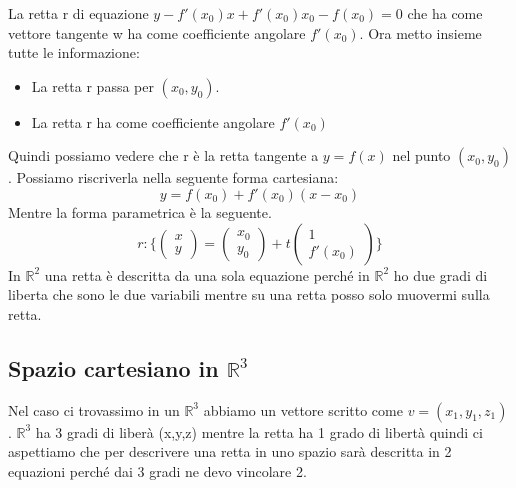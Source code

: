 La retta r di equazione $y - f'(x_0)x + f'(x_0)x_0 - f(x_0) = 0$ che ha come vettore tangente w ha come coefficiente angolare $f'(x_0)$. Ora metto insieme tutte le informazione:
\begin{itemize}
    \item La retta r passa per $(x_0, y_0)$.
    \item La retta r ha come coefficiente angolare $f'(x_0)$
\end{itemize}
Quindi possiamo vedere che r è la retta tangente a $y=f(x)$ nel punto $(x_0, y_0)$. Possiamo riscriverla nella seguente forma cartesiana:
\[y = f(x_0) + f'(x_0)(x-x_0)\]
Mentre la forma parametrica è la seguente.
\[r: \Bigg\{ \begin{pmatrix}x\\y\end{pmatrix} = \begin{pmatrix}x_0\\y_0\end{pmatrix} + t \begin{pmatrix}1\\f'(x_0)\end{pmatrix}\Bigg\}\]
In $\mathbb{R}^2$ una retta è descritta da una sola equazione perché in $\mathbb{R}^2$ ho due gradi di liberta che sono le due variabili mentre su una retta posso solo muovermi sulla retta.

\subsection{Spazio cartesiano in $\mathbb{R}^3$}
Nel caso ci trovassimo in un $\mathbb{R}^3$ abbiamo un vettore scritto come $v = (x_1, y_1, z_1)$. $\mathbb{R}^3$ ha 3 gradi di liberà (x,y,z) mentre la retta ha 1 grado di libertà quindi ci aspettiamo che per descrivere una retta in uno spazio sarà descritta in 2 equazioni perché dai 3 gradi ne devo vincolare 2.

